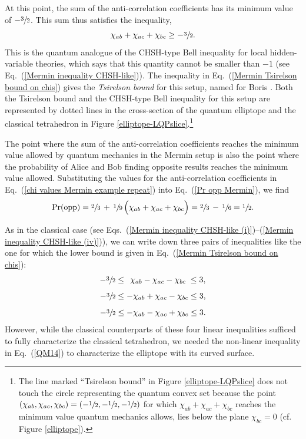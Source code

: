 At this point, the sum of the anti-correlation coefficients has its minimum value of $-\sfrac32$. This sum thus satisfies the inequality,
\begin{equation}
\chi_{ab} + \chi_{ac} + \chi_{bc} \ge -\sfrac32.
\label{Mermin Tsirelson bound on chis}
\end{equation}
This is the quantum analogue of the CHSH-type Bell inequality for local hidden-variable theories, which says that this quantity cannot be smaller than $-1$ (see Eq.\ (\ref{Mermin inequality CHSH-like})). The inequality in Eq.\ (\ref{Mermin Tsirelson bound on chis}) gives the \emph{Tsirelson bound} for this setup, named for Boris \citet{Cirel'son 1980}. Both the Tsirelson bound and the CHSH-type Bell inequality for this setup are represented by dotted lines in the cross-section of the quantum elliptope and the classical tetrahedron in Figure \ref{elliptope-LQPslice}.\footnote{The line marked ``Tsirelson bound'' in Figure \ref{elliptope-LQPslice} does not touch the circle representing the quantum convex set because the point $(\chi_{ab}, \chi_{ac}, \chi_{bc}) = (-\sfrac12, -\sfrac12, -\sfrac12)$ for which $\chi_{ab} + \chi_{ac} + \chi_{bc}$ reaches the minimum value quantum mechanics allows, lies below the plane $\chi_{bc}=0$ (cf. Figure \ref{elliptope}).} 

The point where the sum of the anti-correlation coefficients reaches the minimum value allowed by quantum mechanics in the Mermin setup is also the point where the probability of Alice and Bob finding opposite results reaches the minimum value allowed. Substituting the values for the anti-correlation coefficients in Eq.\ (\ref{chi values Mermin example repeat}) into Eq.\ (\ref{Pr opp Mermin}), we find
\begin{equation}
\mathrm{Pr(opp)} = \sfrac{2}{3} \, + \, \sfrac{1}{9} \, \Big(\chi_{ab} + \chi_{ac} + \chi_{bc} \Big) = \sfrac23 \, - \, \sfrac16 = \sfrac12.
\label{Pr opp Mermin (double)}
\end{equation}

As in the classical case (see Eqs.\ (\ref{Mermin inequality CHSH-like (i)})--(\ref{Mermin inequality CHSH-like (iv)})), we can write down three pairs of inequalities like the one for which the lower bound is given in Eq.\ (\ref{Mermin Tsirelson bound on chis}):  
\begin{equation}
-\sfrac32 \le \;\, \chi_{ab} - \chi_{ac} - \chi_{bc} \; \le 3, 
\label{Mermin Tsirelson bound on chis (ii)}
\end{equation}
\begin{equation}
-\sfrac32 \le - \chi_{ab} + \chi_{ac} - \chi_{bc} \le 3, 
\label{Mermin Tsirelson bound on chis (iii)}
\end{equation}
\begin{equation}
-\sfrac32 \le - \chi_{ab} - \chi_{ac} + \chi_{bc} \le 3.
\label{Mermin Tsirelson bound on chis (iv)}
\end{equation}
However, while the classical counterparts of these four linear inequalities sufficed to fully characterize the classical tetrahedron, we needed the non-linear inequality in Eq.\ (\ref{QM14}) to characterize the elliptope with its curved surface. 
